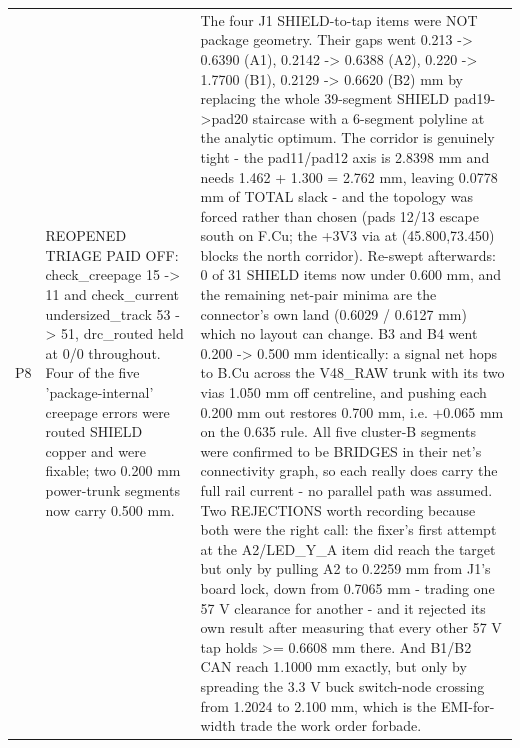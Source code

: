 \documentclass[11pt,a4paper]{article}
\begin{document}
{\begin{longtable}{lp{5.2cm}p{7.2cm}}
P8 & REOPENED TRIAGE PAID OFF: check\_creepage 15 -\textgreater{} 11 and check\_current undersized\_track 53 -\textgreater{} 51, drc\_routed held at 0/0 throughout. Four of the five 'package-internal' creepage errors were routed SHIELD copper and were fixable; two 0.200 mm power-trunk segments now carry 0.500 mm. & The four J1 SHIELD-to-tap items were NOT package geometry. Their gaps went 0.213 -\textgreater{} 0.6390 (A1), 0.2142 -\textgreater{} 0.6388 (A2), 0.220 -\textgreater{} 1.7700 (B1), 0.2129 -\textgreater{} 0.6620 (B2) mm by replacing the whole 39-segment SHIELD pad19-\textgreater{}pad20 staircase with a 6-segment polyline at the analytic optimum. The corridor is genuinely tight - the pad11/pad12 axis is 2.8398 mm and needs 1.462 + 1.300 = 2.762 mm, leaving 0.0778 mm of TOTAL slack - and the topology was forced rather than chosen (pads 12/13 escape south on F.Cu; the +3V3 via at (45.800,73.450) blocks the north corridor). Re-swept afterwards: 0 of 31 SHIELD items now under 0.600 mm, and the remaining net-pair minima are the connector's own land (0.6029 / 0.6127 mm) which no layout can change. B3 and B4 went 0.200 -\textgreater{} 0.500 mm identically: a signal net hops to B.Cu across the V48\_RAW trunk with its two vias 1.050 mm off centreline, and pushing each 0.200 mm out restores 0.700 mm, i.e. +0.065 mm on the 0.635 rule. All five cluster-B segments were confirmed to be BRIDGES in their net's connectivity graph, so each really does carry the full rail current - no parallel path was assumed. Two REJECTIONS worth recording because both were the right call: the fixer's first attempt at the A2/LED\_Y\_A item did reach the target but only by pulling A2 to 0.2259 mm from J1's board lock, down from 0.7065 mm - trading one 57 V clearance for another - and it rejected its own result after measuring that every other 57 V tap holds \textgreater{}= 0.6608 mm there. And B1/B2 CAN reach 1.1000 mm exactly, but only by spreading the 3.3 V buck switch-node crossing from 1.2024 to 2.100 mm, which is the EMI-for-width trade the work order forbade. \\

\end{longtable}}
\end{document}

